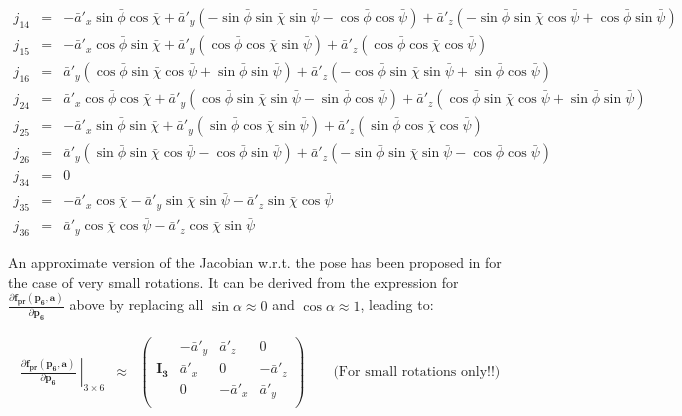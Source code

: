 \documentclass[a4paper,11pt]{report}
\begin{document}
\begin{eqnarray*}
j_{14} &=&
-\bar a'_x \sin \bar\phi \cos \bar\chi+\bar a'_y (-\sin \bar\phi \sin \bar\chi \sin \bar\psi-\cos \bar\phi \cos \bar\psi)+\bar a'_z (-\sin \bar\phi \sin \bar\chi \cos
\bar\psi+\cos
\bar\phi \sin \bar\psi)
\\
j_{15} &=&
-\bar a'_x \cos \bar\phi \sin \bar\chi+\bar a'_y (\cos \bar\phi \cos \bar\chi \sin \bar\psi       )+\bar a'_z (\cos \bar\phi \cos \bar\chi \cos \bar\psi      )
\\
j_{16} &=&
\bar a'_y (\cos \bar\phi \sin \bar\chi \cos \bar\psi+\sin \bar\phi \sin \bar\psi)+\bar a'_z (-\cos \bar\phi \sin \bar\chi \sin \bar\psi+\sin \bar\phi \cos \bar\psi)
\\
j_{24} &=&
\bar a'_x \cos \bar\phi \cos \bar\chi+\bar a'_y (\cos \bar\phi \sin \bar\chi \sin \bar\psi-\sin \bar\phi \cos \bar\psi)+\bar a'_z (\cos \bar\phi \sin \bar\chi \cos
\bar\psi+\sin
\bar\phi \sin \bar\psi)
\\
j_{25} &=&
-\bar a'_x \sin \bar\phi \sin \bar\chi+\bar a'_y (\sin \bar\phi \cos \bar\chi \sin \bar\psi)      +\bar a'_z (\sin \bar\phi \cos \bar\chi \cos \bar\psi      )
\\
j_{26} &=&
\bar a'_y (\sin \bar\phi \sin \bar\chi \cos \bar\psi-\cos \bar\phi \sin \bar\psi)+\bar a'_z (-\sin \bar\phi \sin \bar\chi \sin \bar\psi-\cos \bar\phi \cos \bar\psi)
\\
j_{34} &=&
0
\\
j_{35} &=&
    -\bar a'_x \cos \bar\chi-\bar a'_y \sin \bar\chi \sin \bar\psi-\bar a'_z \sin \bar\chi \cos \bar\psi
\\
j_{36} &=&
\bar a'_y \cos \bar\chi \cos \bar\psi-\bar a'_z \cos \bar\chi \sin \bar\psi
\end{eqnarray*}


An approximate version of the Jacobian w.r.t. the pose has been proposed in
\cite{sibley2009rba} for the case of very small rotations.
It can be derived from the expression for
$\frac{\partial \mathbf{f_{pr}} (\mathbf{p_6},\mathbf{a})}{\partial \mathbf{p_6}}$
above by replacing all $\sin \alpha \approx 0$ and $\cos \alpha \approx 1$,
leading to:

\begin{eqnarray}
\left. \frac{\partial \mathbf{f_{pr}} (\mathbf{p_6},\mathbf{a})}{\partial \mathbf{p_6}} ~
\right|_{3 \times 6}
&\approx&
\left(
\begin{array}{c|ccc}
~            & -\bar a'_y & \bar a'_z & 0 \\
\mathbf{I_3} & \bar a'_x & 0 & -\bar a'_z \\
~            & 0 & -\bar a'_x & \bar a'_y \\
\end{array}
\right)
\quad\quad \text{(For small rotations only!!)}
\end{eqnarray}
\end{document}
